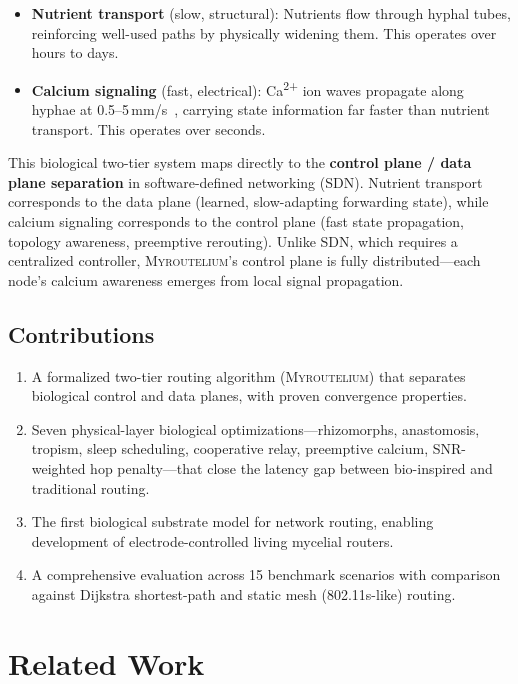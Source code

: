 \documentclass[conference,10pt]{IEEEtran}
\newcommand{\myc}{\textsc{Myroutelium}}
\newcommand{\calcium}{Ca\textsuperscript{2+}}
\begin{document}
\begin{itemize}
    \item \textbf{Nutrient transport} (slow, structural): Nutrients flow through hyphal tubes, reinforcing well-used paths by physically widening them. This operates over hours to days.
    \item \textbf{Calcium signaling} (fast, electrical): \calcium{} ion waves propagate along hyphae at 0.5--5\,mm/s~\cite{adamatzky2018}, carrying state information far faster than nutrient transport. This operates over seconds.
\end{itemize}

This biological two-tier system maps directly to the \textbf{control plane / data plane separation} in software-defined networking (SDN). Nutrient transport corresponds to the data plane (learned, slow-adapting forwarding state), while calcium signaling corresponds to the control plane (fast state propagation, topology awareness, preemptive rerouting). Unlike SDN, which requires a centralized controller, \myc{}'s control plane is fully distributed---each node's calcium awareness emerges from local signal propagation.

\subsection{Contributions}

\begin{enumerate}
    \item A formalized two-tier routing algorithm (\myc{}) that separates biological control and data planes, with proven convergence properties.
    \item Seven physical-layer biological optimizations---rhizomorphs, anastomosis, tropism, sleep scheduling, cooperative relay, preemptive calcium, SNR-weighted hop penalty---that close the latency gap between bio-inspired and traditional routing.
    \item The first biological substrate model for network routing, enabling development of electrode-controlled living mycelial routers.
    \item A comprehensive evaluation across 15 benchmark scenarios with comparison against Dijkstra shortest-path and static mesh (802.11s-like) routing.
\end{enumerate}

\section{Related Work}
\label{sec:related}
\end{document}
